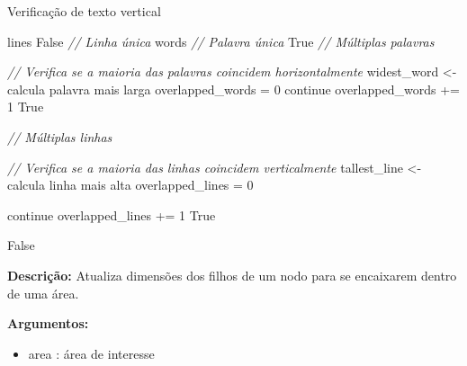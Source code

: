 \begin{breakablealgorithm}
	\caption{Verificação de texto vertical}
	\footnotesize
	\begin{algorithmic}[1]
			\State lines
				\Return False
			\EndIf
			\State \textit{// Linha única}
				\State words
			 \State \textit{// Palavra única}
						\Return True
					\EndIf
				\State \textit{// Múltiplas palavras} 
				
				\Else
					\State \textit{// Verifica se a maioria das palavras coincidem horizontalmente}
					\State widest\_word <- calcula palavra mais larga
					\State overlapped\_words = 0
							\State continue
						\EndIf
							\State overlapped\_words += 1
						\EndIf
					\EndFor
						\Return True
					\EndIf
					
				\EndIf
				
			\State \textit{// Múltiplas linhas} 
			
			\Else
				\State \textit{// Verifica se a maioria das linhas coincidem verticalmente}
				\State tallest\_line <- calcula linha mais alta
				\State overlapped\_lines = 0
				
						\State continue
					\EndIf
						\State overlapped\_lines += 1
					\EndIf
				\EndFor
					\Return True
				\EndIf
			
			\EndIf
			
		\EndIf
		
		\Return	False
		
	\end{algorithmic}
\end{breakablealgorithm}




\textbf{Descrição:} Atualiza dimensões dos filhos de um nodo para se encaixarem dentro de uma área.


\textbf{Argumentos:}
\begin{itemize}\setlength\itemsep{-0.3em}
	\item area : área de interesse
\end{itemize}



